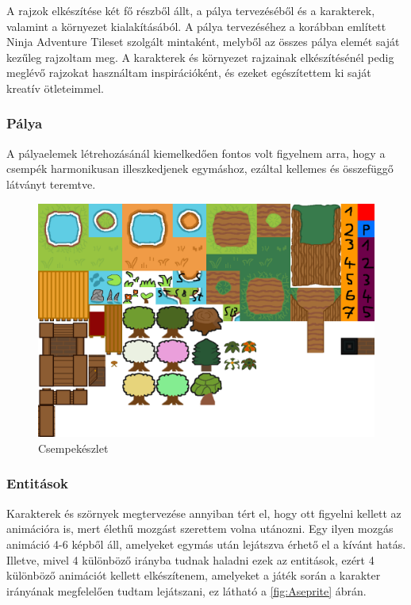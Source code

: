 A rajzok elkészítése két fő részből állt, a pálya tervezéséből és a karakterek, valamint a környezet kialakításából. A pálya tervezéséhez a korábban említett Ninja Adventure Tileset szolgált mintaként, melyből az összes pálya elemét saját kezűleg rajzoltam meg. A karakterek és környezet rajzainak elkészítésénél pedig meglévő rajzokat használtam inspirációként, és ezeket egészítettem ki saját kreatív ötleteimmel.

\subsubsection{Pálya}
 A pályaelemek létrehozásánál kiemelkedően fontos volt figyelnem arra, hogy a csempék harmonikusan illeszkedjenek egymáshoz, ezáltal kellemes és összefüggő látványt teremtve.

\begin{figure}[H]
    \centering
    \includegraphics[width=12.0truecm]{images/tileset.png}
    \caption{Csempekészlet}
    \label{fig:Csempekészlet}
\end{figure}

\subsubsection{Entitások}
 Karakterek és szörnyek megtervezése annyiban tért el, hogy ott figyelni kellett az animációra is, mert élethű mozgást szerettem volna utánozni. Egy ilyen mozgás animáció 4-6 képből áll, amelyeket egymás után lejátszva érhető el a kívánt hatás. Illetve, mivel 4 különböző irányba tudnak haladni ezek az entitások, ezért 4 különböző animációt kellett elkészítenem, amelyeket a játék során a karakter irányának megfelelően tudtam lejátszani, ez látható a \ref{fig:Aseprite} ábrán.

